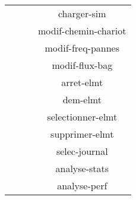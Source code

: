 \begin{center}
\begin{tabular}{|c|c|c|}
	 ~&   ~& charger-sim \\ 
	 ~&   ~& modif-chemin-chariot \\ 
	 ~&   ~& modif-freq-pannes \\ 
	 ~&   ~& modif-flux-bag \\ 
	 ~&   ~& arret-elmt \\ 
	 ~&   ~& dem-elmt \\ 
	 ~&   ~& selectionner-elmt \\ 
	 ~&   ~& supprimer-elmt \\ 
	 ~&   ~& selec-journal \\ 
	 ~&   ~& analyse-stats \\ 
	 ~&   ~& analyse-perf \\ 
\hline
\end{tabular}
\end{center}
